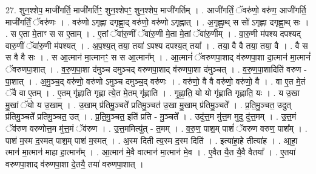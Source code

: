 \documentclass[17pt]{extarticle}
\begin{document}
27. शुन॒श्शेप॒ माजी॑गर्ति॒ माजी॑गर्तिꣳ॒॒ शुन॒श्शेपꣳ॒॒ शुन॒श्शेप॒ माजी॑गर्तिम् । . आजी॑गर्तिं॒ ॅवरु॑णो॒ वरु॑ण॒ आजी॑गर्ति॒ माजी॑गर्तिं॒ ॅवरु॑णः । . वरु॑णो ऽगृह्णा दगृह्णा॒द् वरु॑णो॒ वरु॑णो ऽगृह्णात् । . अ॒गृ॒ह्णा॒थ् स सो॑ ऽगृह्णा दगृह्णा॒थ् सः । . स ए॒ता मे॒ताꣳ स स ए॒ताम् । . ए॒तां ॅवा॑रु॒णीं ॅवा॑रु॒णी मे॒ता मे॒तां ॅवा॑रु॒णीम् । . वा॒रु॒णी म॑पश्य दपश्यद् वारु॒णीं ॅवा॑रु॒णी म॑पश्यत् । . अ॒प॒श्य॒त् तया॒ तया॑ ऽपश्य दपश्य॒त् तया᳚ । . तया॒ वै वै तया॒ तया॒ वै । . वै स स वै वै सः । . स आ॒त्मान॑ मा॒त्मानꣳ॒॒ स स आ॒त्मान᳚म् । . आ॒त्मानं॑ ॅवरुणपा॒शाद् व॑रुणपा॒शा दा॒त्मान॑ मा॒त्मानं॑ ॅवरुणपा॒शात् । . व॒रु॒ण॒पा॒शा द॑मुञ्च दमुञ्चद् वरुणपा॒शाद् व॑रुणपा॒शा द॑मुञ्चत् । . व॒रु॒ण॒पा॒शादिति॑ वरुण - पा॒शात् । . अ॒मु॒ञ्च॒द् वरु॑णो॒ वरु॑णो ऽमुञ्च दमुञ्च॒द् वरु॑णः । . वरु॑णो॒ वै वै वरु॑णो॒ वरु॑णो॒ वै । . वा ए॒त मे॒तं ॅवै वा ए॒तम् । . ए॒तम् गृ॑ह्णाति गृह्णा त्ये॒त मे॒तम् गृ॑ह्णाति । . गृ॒ह्णा॒ति॒ यो यो गृ॑ह्णाति गृह्णाति॒ यः । . य उ॒खा मु॒खां ॅयो य उ॒खाम् । . उ॒खाम् प्र॑तिमु॒ञ्चते᳚ प्रतिमु॒ञ्चत॑ उ॒खा मु॒खाम् प्र॑तिमु॒ञ्चते᳚ । . प्र॒ति॒मु॒ञ्चत॒ उदुत् प्र॑तिमु॒ञ्चते᳚ प्रतिमु॒ञ्चत॒ उत् । . प्र॒ति॒मु॒ञ्चत॒ इति॑ प्रति - मु॒ञ्चते᳚ । . उदु॑त्त॒म मु॑त्त॒म मुदु दु॑त्त॒मम् । . उ॒त्त॒मं ॅव॑रुण वरुणोत्त॒म मु॑त्त॒मं ॅव॑रुण । . उ॒त्त॒ममित्यु॑त् - त॒मम् । . व॒रु॒ण॒ पाश॒म् पाशं॑ ॅवरुण वरुण॒ पाश᳚म् । . पाश॑ म॒स्म द॒स्मत् पाश॒म् पाश॑ म॒स्मत् । . अ॒स्म दिती त्य॒स्म द॒स्म दिति॑ । . इत्या॑हा॒हे तीत्या॑ह । . आ॒हा॒ त्मान॑ मा॒त्मान॑ माहा हा॒त्मान᳚म् । . आ॒त्मान॑ मे॒वै वात्मान॑ मा॒त्मान॑ मे॒व । . ए॒वैत यै॒त यै॒वै वैतया᳚ । . ए॒तया॑ वरुणपा॒शाद् व॑रुणपा॒शा दे॒तयै॒ तया॑ वरुणपा॒शात् । \newline
\end{document}
